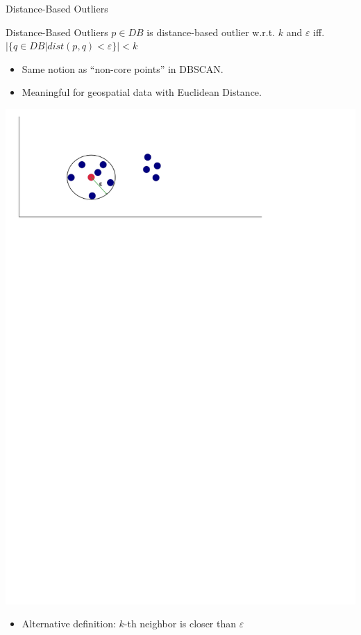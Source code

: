 \documentclass{beamer}
\begin{document}
\begin{frame}{Distance-Based Outliers}
    \begin{block}{Distance-Based Outliers}
        $p\in DB$ is distance-based outlier w.r.t. $k$ and $\varepsilon$
        iff. $|\{q\in DB | dist(p,q) < \varepsilon\}| < k$
    \end{block}

    \begin{itemize}
        \item Same notion as ``non-core points'' in DBSCAN.
        \item Meaningful for geospatial data with Euclidean Distance.
    \end{itemize}
    \includegraphics[width=.5\textwidth]{images/dboutliers.png}
    \begin{itemize}
        \item Alternative definition: $k$-th neighbor is closer than $\varepsilon$
    \end{itemize}
    
\end{frame}
\end{document}
